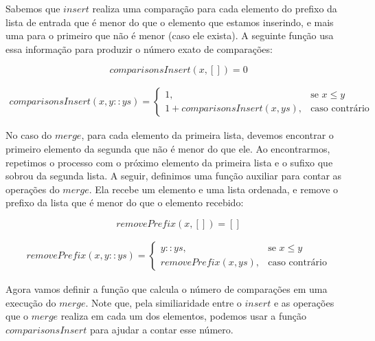 \documentclass[12pt, oneside, a4paper,english,brazil]{abntex2}
\begin{document}
\qquad Sabemos que $insert$ realiza uma compara\c{c}\~ao para cada elemento do prefixo da lista
de entrada que \'e menor do que o elemento que estamos inserindo, e mais uma para o primeiro
que n\~ao \'e menor (caso ele exista). A seguinte fun\c{c}\~ao usa essa informa\c{c}\~ao
para produzir o n\'umero exato de compara\c{c}\~oes:

\begin{equation} \label{comp_ins_base}
  comparisonsInsert(x, []) = 0
\end{equation}


\begin{equation} \label{comp_ins_ind}
\begin{split}
  comparisonsInsert(x, y :: ys) =
    \begin{cases}
      1, &\text{se } x \le y \\
      1 + comparisonsInsert(x, ys), &\text{caso contr\'ario}
    \end{cases}
\end{split}
\end{equation}


\qquad No caso do $merge$, para cada elemento da primeira lista, devemos encontrar o primeiro
elemento da segunda que n\~ao \'e menor do que ele. Ao encontrarmos, repetimos o processo com o pr\'oximo
elemento da primeira lista e o sufixo que sobrou da segunda lista. A seguir, definimos uma
fun\c{c}\~ao auxiliar para contar as opera\c{c}\~oes do $merge$. Ela
recebe um elemento e uma lista ordenada, e remove o prefixo da lista que \'e menor do que o elemento
recebido:

\begin{equation} \label{rem_pref_base}
  removePrefix(x, []) = []
\end{equation}

\begin{equation} \label{rem_pref_ind}
\begin{split}
  removePrefix(x, y :: ys) =
    \begin{cases}
      y :: ys, &\text{se } x \le y \\
      removePrefix(x, ys), &\text{caso contr\'ario}
    \end{cases}
\end{split}
\end{equation}

\qquad Agora vamos definir a fun\c{c}\~ao que calcula o n\'umero de compara\c{c}\~oes em uma execu\c{c}\~ao
do $merge$. Note que, pela similiaridade entre
o $insert$ e as opera\c{c}\~oes que o $merge$ realiza em cada um dos elementos,
podemos usar a fun\c{c}\~ao $comparisonsInsert$ para ajudar a contar esse n\'umero.
\end{document}
